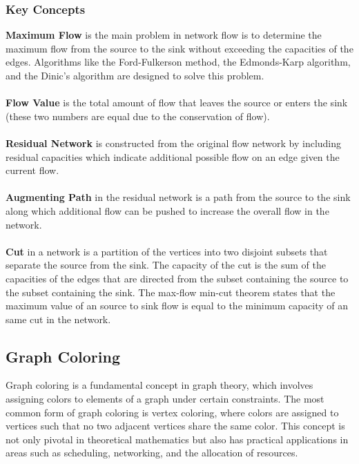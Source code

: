 \documentclass[12pt]{article}
\begin{document}
    \subsubsection{Key Concepts}

    \textbf{Maximum Flow} is the main problem in network flow is to determine the
    maximum flow from the source to the sink without exceeding the capacities
    of the edges. Algorithms like the Ford-Fulkerson method, the Edmonds-Karp
    algorithm, and the Dinic's algorithm are designed to solve this problem.\\
    \\
    \textbf{Flow Value} is the total amount of flow that leaves the source or
    enters the sink (these two numbers are equal due to the conservation of flow).\\
    \\
    \textbf{Residual Network} is constructed from the original flow network by
    including residual capacities which indicate additional possible flow on an
    edge given the current flow.\\
    \\
    \textbf{Augmenting Path} in the residual network is a path from the source
    to the sink along which additional flow can be pushed to increase the overall
    flow in the network.\\
    \\
    \textbf{Cut} in a network is a partition of the vertices into two disjoint subsets
    that separate the source from the sink. The capacity of the cut is the sum of
    the capacities of the edges that are directed from the subset containing the
    source to the subset containing the sink. The max-flow min-cut theorem states
    that the maximum value of an source to sink flow is equal to the minimum
    capacity of an same cut in the network.
    
    \subsection{Graph Coloring}
    Graph coloring is a fundamental concept in graph theory, which involves assigning
    colors to elements of a graph under certain constraints. The most common form
    of graph coloring is vertex coloring, where colors are assigned to vertices
    such that no two adjacent vertices share the same color. This concept
    is not only pivotal in theoretical mathematics but also has practical
    applications in areas such as scheduling, networking, and the allocation
    of resources.
\end{document}
